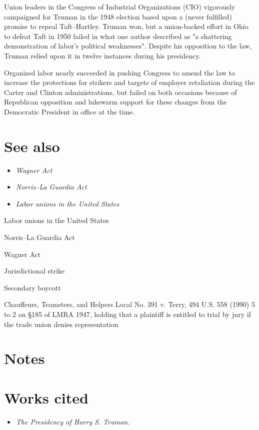 Union leaders in the Congress of Industrial Organizations (CIO)
vigorously campaigned for Truman in the 1948 election based upon a
(never fulfilled) promise to repeal Taft--Hartley. Truman won, but a
union-backed effort in Ohio to defeat Taft in 1950 failed in what one
author described as "a shattering demonstration of labor's political
weaknesses". Despite his opposition to the law, Truman relied upon it in
twelve instances during his presidency.

Organized labor nearly succeeded in pushing Congress to amend the law to
increase the protections for strikers and targets of employer
retaliation during the Carter and Clinton administrations, but failed on
both occasions because of Republican opposition and lukewarm support for
these changes from the Democratic President in office at the time.

\section{See also}\label{see-also}

\begin{itemize}
\item
  \emph{Wagner Act}
\item
  \emph{Norris--La Guardia Act}
\item
  \emph{Labor unions in the United States}
\end{itemize}

Labor unions in the United States

Norris--La Guardia Act

Wagner Act

Jurisdictional strike

Secondary boycott

Chauffeurs, Teamsters, and Helpers Local No. 391 v. Terry, 494 U.S. 558
(1990) 5 to 2 on §185 of LMRA 1947, holding that a plaintiff is entitled
to trial by jury if the trade union denies representation

\section{Notes}\label{notes}

\section{Works cited}\label{works-cited}

\begin{itemize}
\item
  \emph{The Presidency of Harry S. Truman.}
\end{itemize}

